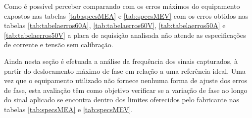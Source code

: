 \begin{table}[htb]
\end{table}

Como é possível perceber comparando com os erros máximos do equipamento expostos nas tabelas \ref{tab:specsMEA} e \ref{tab:specsMEV} com os erros obtidos nas tabelas \ref{tab:tabelaerros60A}, \ref{tab:tabelaerros60V}, \ref{tab:tabelaerros50A} e \ref{tab:tabelaerros50V} a placa de aquisição analisada não atende as especificações de corrente e tensão sem calibração.

Ainda nesta seção é efetuada a análise da frequência dos sinais capturados, à partir do deslocamento máximo de fase em relação a uma referência ideal. Uma vez que o equipamento utilizado não fornece nenhuma forma de ajuste dos erros de fase, esta avaliação têm como objetivo verificar se a variação de fase ao longo do sinal aplicado se encontra dentro dos limites oferecidos pelo fabricante nas tabelas \ref{tab:specsMEA} e \ref{tab:specsMEV}.

